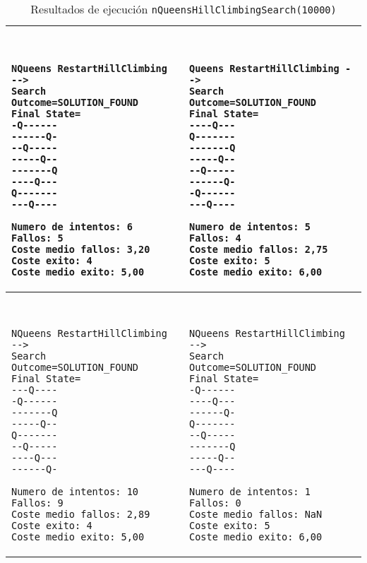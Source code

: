\documentclass[..main.tex]{subfiles}
\begin{document}
\begin{table}[h]
\centering
\begin{tabular}{|l|l|}
\hline
\begin{minipage}{2.5in}
\begin{verbatim}
 
 
NQueens RestartHillClimbing -->
Search Outcome=SOLUTION_FOUND
Final State=
-Q------
------Q-
--Q-----
-----Q--
-------Q
----Q---
Q-------
---Q----

Numero de intentos: 6
Fallos: 5
Coste medio fallos: 3,20
Coste exito: 4
Coste medio exito: 5,00
 \end{verbatim}
 \end{minipage}
&
\begin{minipage}{2.5in}
 \begin{verbatim}


Queens RestartHillClimbing -->
Search Outcome=SOLUTION_FOUND
Final State=
----Q---
Q-------
-------Q
-----Q--
--Q-----
------Q-
-Q------
---Q----

Numero de intentos: 5
Fallos: 4
Coste medio fallos: 2,75
Coste exito: 5
Coste medio exito: 6,00
 \end{verbatim}
 \end{minipage}
 \\
\hline
\begin{minipage}{2.5in}
 \begin{verbatim}
 
 
NQueens RestartHillClimbing -->
Search Outcome=SOLUTION_FOUND
Final State=
---Q----
-Q------
-------Q
-----Q--
Q-------
--Q-----
----Q---
------Q-

Numero de intentos: 10
Fallos: 9
Coste medio fallos: 2,89
Coste exito: 4
Coste medio exito: 5,00

\end{verbatim}
\end{minipage}
 &
 \begin{minipage}{2.5in}
  \begin{verbatim}
  
  
NQueens RestartHillClimbing -->
Search Outcome=SOLUTION_FOUND
Final State=
-Q------
----Q---
------Q-
Q-------
--Q-----
-------Q
-----Q--
---Q----

Numero de intentos: 1
Fallos: 0
Coste medio fallos: NaN
Coste exito: 5
Coste medio exito: 6,00

\end{verbatim}
\end{minipage}
\\
\hline
 \end{tabular}
      \caption{\label{t1-rhc} Resultados de ejecución \texttt{nQueensHillClimbingSearch(10000)}}
\end{table}
\end{document}
